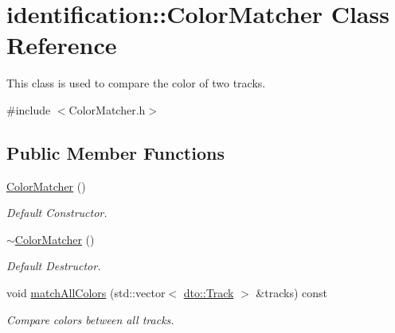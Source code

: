 \hypertarget{classidentification_1_1_color_matcher}{}\section{identification\+:\+:Color\+Matcher Class Reference}
\label{classidentification_1_1_color_matcher}


This class is used to compare the color of two tracks.  




{\ttfamily \#include $<$Color\+Matcher.\+h$>$}

\subsection*{Public Member Functions}
\begin{DoxyCompactItemize}
\item 
\mbox{\label{classidentification_1_1_color_matcher_a67c82d4c7019d28b79d14928e996b8d3}} 
\mbox{\hyperlink{classidentification_1_1_color_matcher_a67c82d4c7019d28b79d14928e996b8d3}{Color\+Matcher}} ()
\begin{DoxyCompactList}\small\item\em Default Constructor. \end{DoxyCompactList}\item 
\mbox{\label{classidentification_1_1_color_matcher_a43a8feed1ea4ffe20fe44e687ac4bc43}} 
\mbox{\hyperlink{classidentification_1_1_color_matcher_a43a8feed1ea4ffe20fe44e687ac4bc43}{$\sim$\+Color\+Matcher}} ()
\begin{DoxyCompactList}\small\item\em Default Destructor. \end{DoxyCompactList}\item 
\mbox{\label{classidentification_1_1_color_matcher_acfb8ac47ef356cf5bab3ee9c1ecc0d87}} 
void \mbox{\hyperlink{classidentification_1_1_color_matcher_acfb8ac47ef356cf5bab3ee9c1ecc0d87}{match\+All\+Colors}} (std\+::vector$<$ \mbox{\hyperlink{structdto_1_1_track}{dto\+::\+Track}} $>$ \&tracks) const
\begin{DoxyCompactList}\small\item\em Compare colors between all tracks. \end{DoxyCompactList}\end{DoxyCompactItemize}


